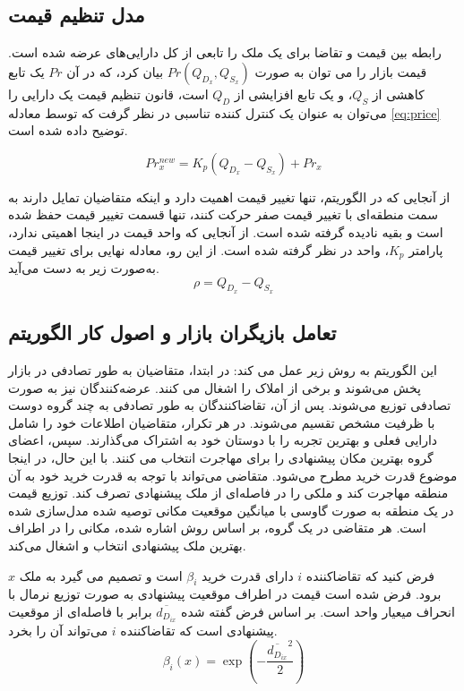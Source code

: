 \subsection{مدل تنظیم قیمت}\label{sec:price_adjustment}

رابطه بین قیمت و تقاضا برای یک ملک را تابعی از کل دارایی‌های عرضه شده است. قیمت بازار را می توان به صورت
$Pr\left(Q_{D_x}, Q_{S_x}\right)$
بیان کرد، که در آن $Pr$ یک تابع کاهشی از $Q_S$، و یک تابع افزایشی از $Q_D$ است، قانون تنظیم قیمت یک دارایی را می‌توان به عنوان یک کنترل کننده تناسبی در نظر گرفت که توسط معادله
\ref{eq:price}
 توضیح داده شده است.
 
 \begin{equation}\label{eq:price}
 	Pr_x^{new} = K_p\left(Q_{D_x} - Q_{S_x}\right) + Pr_x
 \end{equation}

از آنجایی که در الگوریتم، تنها تغییر قیمت اهمیت دارد و اینکه متقاضیان تمایل دارند به سمت منطقه‌ای با تغییر قیمت صفر حرکت کنند، تنها قسمت تغییر قیمت حفظ شده است و بقیه نادیده گرفته شده است. از آنجایی که واحد قیمت در اینجا اهمیتی ندارد، پارامتر $K_p$، واحد در نظر گرفته شده است. از این رو، معادله نهایی برای تغییر قیمت به‌صورت زیر به دست می‌آید.
\begin{equation}
	\rho = Q_{D_x} - Q_{S_x}
\end{equation}



\subsection{تعامل بازیگران بازار و اصول کار الگوریتم}\label{sec:intraction}
این الگوریتم به روش زیر عمل می کند: در ابتدا، متقاضیان به طور تصادفی در بازار پخش می‌شوند و برخی از املاک را اشغال می کنند. عرضه‌کنندگان نیز به صورت تصادفی توزیع می‌شوند. پس از آن، تقاضاکنندگان به طور تصادفی به چند گروه دوست با ظرفیت مشخص تقسیم می‌شوند. در هر تکرار، متقاضیان اطلاعات خود را شامل دارایی فعلی و بهترین تجربه را با دوستان خود به اشتراک می‌گذارند. سپس، اعضای گروه بهترین مکان پیشنهادی را برای مهاجرت انتخاب می کنند. با این حال، در اینجا موضوع قدرت خرید مطرح می‌شود. متقاضی می‌تواند با توجه به قدرت خرید خود به آن منطقه مهاجرت کند و ملکی را در فاصله‌ای از ملک پیشنهادی تصرف کند. توزیع قیمت در یک منطقه به صورت گاوسی با میانگین موقعیت مکانی توصیه شده مدل‌سازی شده است. هر متقاضی در یک گروه، بر اساس روش اشاره شده، مکانی را در اطراف بهترین ملک پیشنهادی انتخاب و اشغال می‌کند.

فرض کنید که تقاضاکننده $i$ دارای قدرت خرید $\beta_i$ است و تصمیم می گیرد به ملک $x$ برود. فرض شده است قیمت در اطراف موقعیت پیشنهادی به صورت توزیع نرمال با انحراف میعیار واحد است. بر اساس فرض گفته شده 
$\overline{d_{D_{ix}}}$ 
برابر با فاصله‌ای از موقعیت پیشنهادی است که تقاضاکننده $i$ می‌تواند آن را بخرد.
\begin{equation}
	\beta_i(x) = \exp(-\dfrac{\overline{d_{D_{ix}}}^2}{2})
\end{equation}

